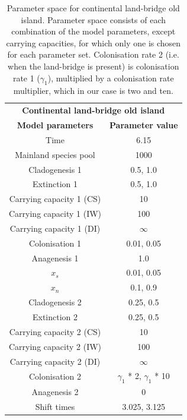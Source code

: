 \begin{table}[ht]
    \centering
    \caption{Parameter space for continental land-bridge old island. Parameter space consists of each combination of the model parameters, except carrying capacities, for which only one is chosen for each parameter set. Colonisation rate 2 (i.e. when the land-bridge is present) is colonisation rate 1 ($\gamma_1$), multiplied by a colonisation rate multiplier, which in our case is two and ten.}
    \begin{tabular}{ c | c }
        \multicolumn{2}{c}{\textbf{Continental land-bridge old island}} \\
        \textbf{Model parameters} & \textbf{Parameter value} \\ 
        \hline
        \hline
        Time & 6.15 \\
        \hline
        Mainland species pool & 1000 \\
        \hline
        Cladogenesis 1 & 0.5, 1.0 \\
        \hline
        Extinction 1 & 0.5, 1.0 \\
        \hline
        Carrying capacity 1 (CS) & 10 \\
        \hline
        Carrying capacity 1 (IW) & 100 \\
        \hline
        Carrying capacity 1 (DI) & $\infty$ \\
        \hline
        Colonisation 1 & 0.01, 0.05 \\
        \hline
        Anagenesis 1 & 1.0 \\
        \hline
        $x_s$ & 0.01, 0.05 \\
        \hline
        $x_n$ & 0.1, 0.9 \\
        \hline
        Cladogenesis 2 & 0.25, 0.5 \\
        \hline
        Extinction 2 & 0.25, 0.5 \\
        \hline
        Carrying capacity 2 (CS) & 10 \\
        \hline
        Carrying capacity 2 (IW) & 100 \\
        \hline
        Carrying capacity 2 (DI) & $\infty$ \\
        \hline
        Colonisation 2 & $\gamma_1$ * 2, $\gamma_1$ * 10 \\ 
        \hline 
        Anagenesis 2 & 0 \\
        \hline
        Shift times & 3.025, 3.125 \\
    \end{tabular}
    \label{tab:continental_lb_old}
\end{table}
